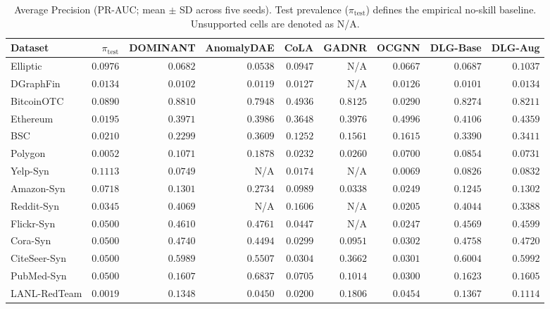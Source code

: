 \documentclass[11pt,a4paper]{article}
\begin{document}
\begin{table}[htbp]
\centering\small\setlength{\tabcolsep}{3.5pt}
\caption{Average Precision (PR-AUC; mean $\pm$ SD across five seeds). Test prevalence ($\pi_{\mathrm{test}}$) defines the empirical no-skill baseline. Unsupported cells are denoted as N/A.}
\label{tab:pr_auc_main}
\begin{tabularx}{\textwidth}{lrrrrrrrr}\toprule
\textbf{Dataset} & $\pi_{\mathrm{test}}$ & \textbf{DOMINANT} & \textbf{AnomalyDAE} & \textbf{CoLA} & \textbf{GADNR} & \textbf{OCGNN} & \textbf{DLG-Base} & \textbf{DLG-Aug} \\\midrule
Elliptic & $0.0976$ & $0.0682$ & $0.0538$ & $0.0947$ & N/A & $0.0667$ & $0.0687$ & $\mathbf{0.1037}$ \\
DGraphFin & $0.0134$ & $0.0102$ & $0.0119$ & $0.0127$ & N/A & $0.0126$ & $0.0101$ & $\mathbf{0.0134}$ \\
BitcoinOTC & $0.0890$ & $\mathbf{0.8810}$ & $0.7948$ & $0.4936$ & $0.8125$ & $0.0290$ & $0.8274$ & $0.8211$ \\
Ethereum & $0.0195$ & $0.3971$ & $0.3986$ & $0.3648$ & $0.3976$ & $\mathbf{0.4996}$ & $0.4106$ & $0.4359$ \\
BSC & $0.0210$ & $0.2299$ & $\mathbf{0.3609}$ & $0.1252$ & $0.1561$ & $0.1615$ & $0.3390$ & $0.3411$ \\
Polygon & $0.0052$ & $0.1071$ & $\mathbf{0.1878}$ & $0.0232$ & $0.0260$ & $0.0700$ & $0.0854$ & $0.0731$ \\
Yelp-Syn & $0.1113$ & $0.0749$ & N/A & $0.0174$ & N/A & $0.0069$ & $0.0826$ & $\mathbf{0.0832}$ \\
Amazon-Syn & $0.0718$ & $0.1301$ & $\mathbf{0.2734}$ & $0.0989$ & $0.0338$ & $0.0249$ & $0.1245$ & $0.1302$ \\
Reddit-Syn & $0.0345$ & $\mathbf{0.4069}$ & N/A & $0.1606$ & N/A & $0.0205$ & $0.4044$ & $0.3388$ \\
Flickr-Syn & $0.0500$ & $0.4610$ & $\mathbf{0.4761}$ & $0.0447$ & N/A & $0.0247$ & $0.4569$ & $0.4599$ \\
Cora-Syn & $0.0500$ & $0.4740$ & $0.4494$ & $0.0299$ & $0.0951$ & $0.0302$ & $\mathbf{0.4758}$ & $0.4720$ \\
CiteSeer-Syn & $0.0500$ & $0.5989$ & $0.5507$ & $0.0304$ & $0.3662$ & $0.0301$ & $\mathbf{0.6004}$ & $0.5992$ \\
PubMed-Syn & $0.0500$ & $0.1607$ & $\mathbf{0.6837}$ & $0.0705$ & $0.1014$ & $0.0300$ & $0.1623$ & $0.1605$ \\\midrule
LANL-RedTeam & $0.0019$ & $0.1348$ & $0.0450$ & $0.0200$ & $\mathbf{0.1806}$ & $0.0454$ & $0.1367$ & $0.1114$ \\\bottomrule
\end{tabularx}
\end{table}
\end{document}
